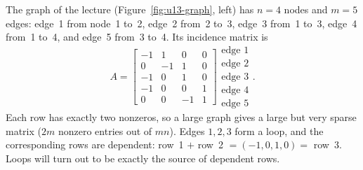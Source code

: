\begin{example}\label{ex:u13-graph}
The graph of the lecture (Figure~\ref{fig:u13-graph}, left) has $n=4$ nodes and $m=5$ edges:
edge~1 from node~1 to~2, edge~2 from~2 to~3, edge~3 from~1 to~3, edge~4 from~1 to~4, and edge~5
from~3 to~4. Its incidence matrix is
\[
A=\begin{bmatrix}-1&1&0&0\\0&-1&1&0\\-1&0&1&0\\-1&0&0&1\\0&0&-1&1\end{bmatrix}
\begin{matrix}\text{edge }1\\\text{edge }2\\\text{edge }3\\\text{edge }4\\\text{edge }5\end{matrix}.
\]
Each row has exactly two nonzeros, so a large graph gives a large but very sparse matrix ($2m$
nonzero entries out of $mn$). Edges $1,2,3$ form a loop, and the corresponding rows are dependent:
row~1 $+$ row~2 $=(-1,0,1,0)=$ row~3. Loops will turn out to be exactly the source of dependent
rows.
\end{example}

